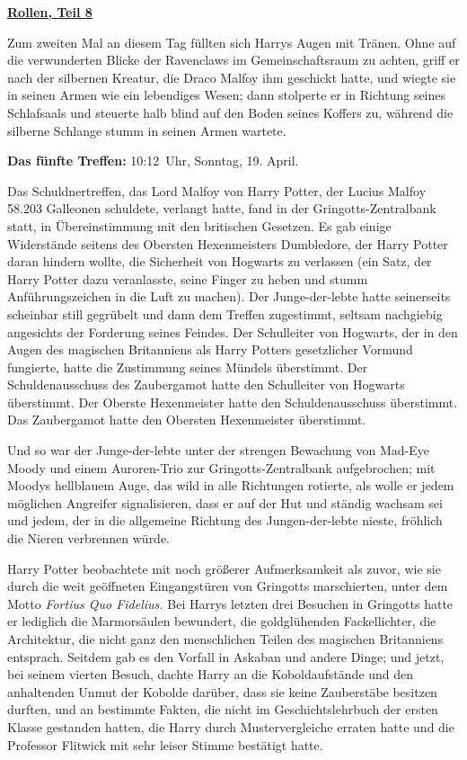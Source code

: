 

\hypertarget{rollen-teil-8}{%

\textbf{\uline{Rollen, Teil 8}}

Zum zweiten Mal an diesem Tag füllten sich Harrys Augen mit Tränen. Ohne auf die verwunderten Blicke der Ravenclaws im Gemeinschaftsraum zu achten, griff er nach der silbernen Kreatur, die Draco Malfoy ihm geschickt hatte, und wiegte sie in seinen Armen wie ein lebendiges Wesen; dann stolperte er in Richtung seines Schlafsaals und steuerte halb blind auf den Boden seines Koffers zu, während die silberne Schlange stumm in seinen Armen wartete.

\textbf{Das fünfte Treffen:} 10:12~Uhr, Sonntag, 19. April.

Das Schuldnertreffen, das Lord Malfoy von Harry Potter, der Lucius Malfoy 58.203 Galleonen schuldete, verlangt hatte, fand in der Gringotts-Zentralbank statt, in Übereinstimmung mit den britischen Gesetzen. Es gab einige Widerstände seitens des Obersten Hexenmeisters Dumbledore, der Harry Potter daran hindern wollte, die Sicherheit von Hogwarts zu verlassen (ein Satz, der Harry Potter dazu veranlasste, seine Finger zu heben und stumm Anführungszeichen in die Luft zu machen). Der Junge-der-lebte hatte seinerseits scheinbar still gegrübelt und dann dem Treffen zugestimmt, seltsam nachgiebig angesichts der Forderung seines Feindes. Der Schulleiter von Hogwarts, der in den Augen des magischen Britanniens als Harry Potters gesetzlicher Vormund fungierte, hatte die Zustimmung seines Mündels überstimmt. Der Schuldenausschuss des Zaubergamot hatte den Schulleiter von Hogwarts überstimmt. Der Oberste Hexenmeister hatte den Schuldenausschuss überstimmt. Das Zaubergamot hatte den Obersten Hexenmeister überstimmt.

Und so war der Junge-der-lebte unter der strengen Bewachung von Mad-Eye Moody und einem Auroren-Trio zur Gringotts-Zentralbank aufgebrochen; mit Moodys hellblauem Auge, das wild in alle Richtungen rotierte, als wolle er jedem möglichen Angreifer signalisieren, dass er auf der Hut und ständig wachsam sei und jedem, der in die allgemeine Richtung des Jungen-der-lebte nieste, fröhlich die Nieren verbrennen würde.

Harry Potter beobachtete mit noch größerer Aufmerksamkeit als zuvor, wie sie durch die weit geöffneten Eingangstüren von Gringotts marschierten, unter dem Motto \emph{Fortius Quo Fidelius.} Bei Harrys letzten drei Besuchen in Gringotts hatte er lediglich die Marmorsäulen bewundert, die goldglühenden Fackellichter, die Architektur, die nicht ganz den menschlichen Teilen des magischen Britanniens entsprach. Seitdem gab es den Vorfall in Askaban und andere Dinge; und jetzt, bei seinem vierten Besuch, dachte Harry an die Koboldaufstände und den anhaltenden Unmut der Kobolde darüber, dass sie keine Zauberstäbe besitzen durften, und an bestimmte Fakten, die nicht im Geschichtslehrbuch der ersten Klasse gestanden hatten, die Harry durch Mustervergleiche erraten hatte und die Professor Flitwick mit sehr leiser Stimme bestätigt hatte.

}
